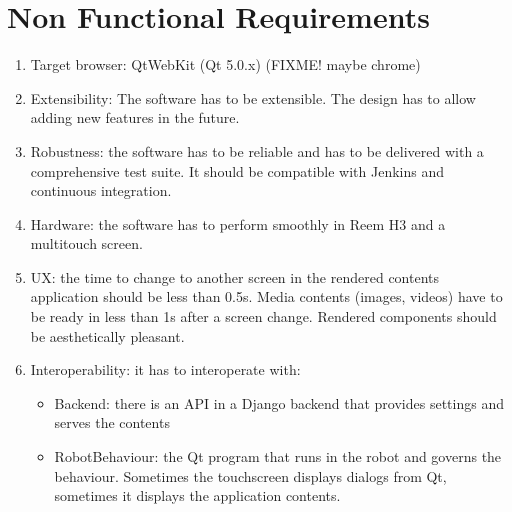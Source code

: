 \section{Non Functional Requirements}
\begin{enumerate}
    \item Target browser: QtWebKit (Qt 5.0.x) (FIXME! maybe chrome)
    \item Extensibility: The software has to be extensible. The design has to allow adding new features in the future.
    \item Robustness: the software has to be reliable and has to be delivered with a comprehensive test suite. It should be compatible with Jenkins and continuous integration.
    \item Hardware: the software has to perform smoothly in Reem H3 and a multitouch screen.
    \item UX: the time to change to another screen in the rendered contents application should be less than 0.5s. Media contents (images, videos) have to be ready in less than 1s after a screen change. Rendered components should be aesthetically pleasant.
    \item Interoperability: it has to interoperate with:
    \begin{itemize}
        \item Backend: there is an API in a Django backend that provides settings and serves the contents
        \item RobotBehaviour: the Qt program that runs in the robot and governs the behaviour. Sometimes the touchscreen displays dialogs from Qt, sometimes it displays the application contents. 
    \end{itemize}
\end{enumerate}
